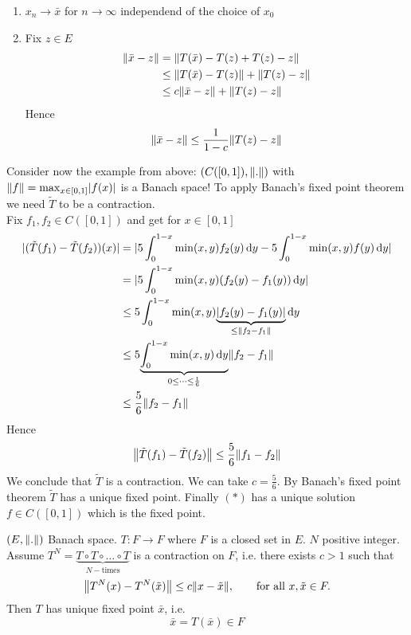 \begin{bemerkung}
	\begin{enumerate}[(1)]
		\item $x_n \to \bar{x}$ for $n \to \infty$ independend of the choice of $x_0$
		\item Fix $z \in E$
		\begin{align*}
			\norm{\bar{x}-z} &= \norm{T(\bar{x})- T(z) + T(z) -z} \\
			&\leq \norm{T(\bar{x})-T(z)} + \norm{T(z) -z} \\
			&\leq c \norm{\bar{x}-z} + \norm{T(z) - z} 
		\end{align*}
		Hence 
		\[
			\norm{\bar{x}-z} \leq \frac{1}{1-c}\norm{T(z)-z}
		\]
	\end{enumerate}
\end{bemerkung}
\begin{beispiel}
	Consider now the example from above: $(C([0,1]), \norm{.})$ with $\norm{f} = \max_{x \in [0,1]}\abs{f(x)}$ is a Banach space! To apply Banach's fixed point theorem we need $\tilde T$ to be a contraction. \\
	Fix $f_1,f_2 \in C([0,1])$ and get for $x \in [0,1]$
	\begin{align*}
		\abs{(\tilde T(f_1)- \tilde T(f_2))(x)} & = \abs{5 \int_{0}^{1-x} \min(x,y)f_2(y) \,\mathrm{d}y - 5 \int_{0}^{1-x}\min(x,y)f(y) \,\mathrm{d}y} \\
		&= \abs{5 \int_{0}^{1-x} \min(x,y)(f_2(y)-f_1(y)) \,\mathrm{d}y} \\
		&\leq 5 \int_{0}^{1-x} \min(x,y) \underset{\leq \norm{f_2-f_1}}{\underbrace{\abs{f_2(y)-f_1(y)}}} \,\mathrm{d}y \\
		&\leq 5 \underset{0 \leq  \dots \leq \frac{1}{6}}{\underbrace{\int_{0}^{1-x} \min(x,y)\,\mathrm{d}y}} \norm{f_2-f_1} \\
		&\leq \frac{5}{6} \norm{f_2-f_1} 
	\end{align*}
	Hence \[
		\norm{\tilde T(f_1)- \tilde T(f_2)} \leq \frac{5}{6} \norm{f_1-f_2}
	\]
	We conclude that $\tilde T$ is a contraction. We can take $c = \frac{5}{6}$. By Banach's fixed point theorem $\tilde T$ has a unique fixed point. Finally $(*)$
	has a unique solution $f \in C([0,1])$ which is the fixed point. 
\end{beispiel}
\begin{theorem*}
	$(E, \norm{.})$ Banach space. $T: F \to F$ where $F$ is a closed set in $E$. $N$ positive integer. Assume $T^N = \underset{N-\text{times}}{\underbrace{T \circ T \circ \dots \circ T}}$ is a contraction on $F$, i.e. there exists $c > 1$ such that
	\[
		\norm{T^N(x)- T^N(\tilde x)} \leq c \norm{x-\tilde x}, \qquad \text{for all }x, \tilde x \in F.
	\]
	Then $T$ has unique fixed point $\bar{ x}$, i.e.
	\[
		\bar{x} = T(\bar{x}) \in F
	\]
\end{theorem*}
